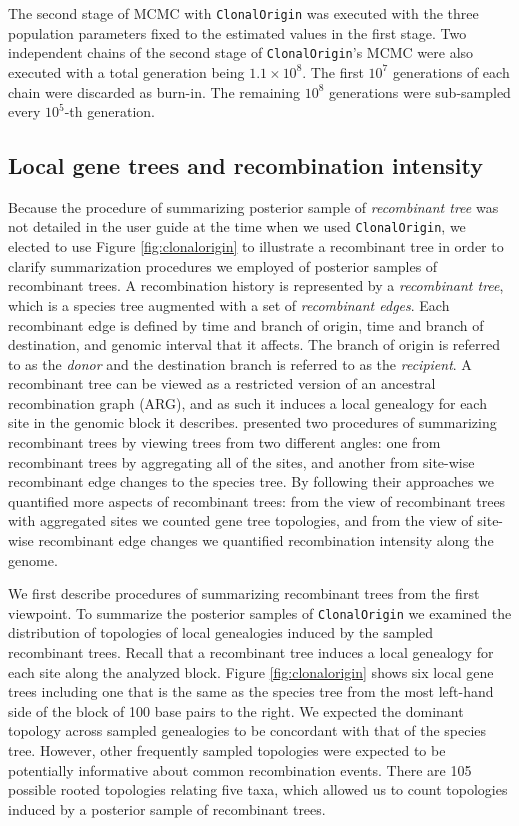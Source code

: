 \documentclass[english]{article}
\begin{document}
The second stage of
MCMC with \texttt{ClonalOrigin} was executed with the three population
parameters fixed to the estimated values in the first stage.  Two independent
chains of the second stage of \texttt{ClonalOrigin}'s MCMC were also executed
with a total generation being $1.1\times10^8$. The first $10^7$ generations of
each chain were discarded as burn-in. The remaining $10^8$ generations were
sub-sampled every $10^5$-th generation.  

\subsection{Local gene trees and recombination intensity}
Because the procedure of summarizing posterior sample of \textit{recombinant
tree} was not detailed in the user guide at the time when we used
\texttt{ClonalOrigin}, we elected to use Figure \ref{fig:clonalorigin} to
illustrate a recombinant tree in order to clarify summarization procedures we
employed of posterior samples of recombinant trees.  A recombination history is
represented by a \textit{recombinant tree}, which is a species tree augmented
with a set of \textit{recombinant edges}.  Each recombinant edge is defined by
time and branch of origin, time and branch of destination, and genomic interval
that it affects. The branch of origin is referred to as the \textit{donor} and
the destination branch is referred to as the \textit{recipient}. A recombinant
tree can be viewed as a restricted version of an ancestral recombination graph
(ARG), and as such it induces a local genealogy for each site in the genomic
block it describes.  \citet{Didelot2010} presented two procedures of summarizing
recombinant trees by viewing trees from two different angles: one from
recombinant trees by aggregating all of the sites, and another from site-wise
recombinant edge changes to the species tree.  By following their approaches we
quantified more aspects of recombinant trees: from the view of recombinant trees
with aggregated sites we counted gene tree topologies, and from the view of
site-wise recombinant edge changes we quantified recombination intensity along
the genome.

We first describe procedures of summarizing recombinant trees from the first
viewpoint.  To summarize the posterior samples of \texttt{ClonalOrigin} we
examined the distribution of topologies of local genealogies induced by the
sampled recombinant trees. Recall that a recombinant tree induces a local
genealogy for each site along the analyzed block.  Figure \ref{fig:clonalorigin}
shows six local gene trees including one that is the same as the species tree
from the most left-hand side of the block of 100 base pairs to the right.  We
expected the dominant topology across sampled genealogies to be concordant with
that of the species tree. However, other frequently sampled topologies were
expected to be potentially informative about common recombination events. There
are 105 possible rooted topologies relating five taxa, which allowed us to count
topologies induced by a posterior sample of recombinant trees.  
\end{document}
